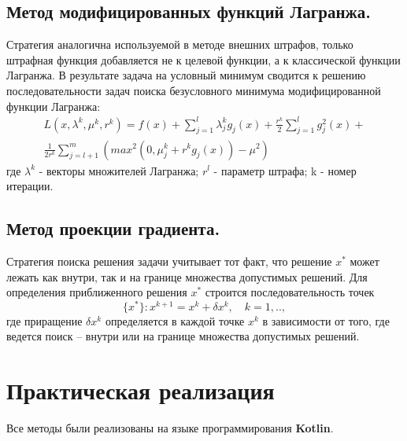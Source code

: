 \documentclass[a4paper, 12pt]{article}   	%
\begin{document}
    
\subsection{Метод модифицированных функций Лагранжа.}
    Стратегия аналогична используемой в методе внешних штрафов, только штрафная функция добавляется не к целевой функции, а к классической функции Лагранжа. В результате задача на условный минимум сводится к решению последовательности задач поиска безусловного минимума модифицированной функции Лагранжа:
    \begin{multline}
        L(x, \lambda ^k, \mu ^k, r^k) = f(x) + \sum_{j=1}^l \lambda_j^k g_j(x) + \frac{r^k}{2} \sum_{j=1}^{l} g_j^2(x) + \\ \frac{1}{2r^k} \sum_{j=l+1}^{m} (max^2(0, \mu_j^k + r^k g_j(x)) - \mu^2)
    \end{multline}
    где $\lambda ^k$  - векторы множителей Лагранжа; $r^l$ - параметр штрафа; k - номер итерации.



\subsection{Метод проекции градиента.}
    Стратегия поиска решения задачи учитывает тот факт, что решение $x^*$ может лежать как внутри, так и на границе множества допустимых решений.
    Для определения приближенного решения $x^*$ строится последовательность точек 
    \begin{equation}
        \{x^*\}: x^{k+1} = x^k + \delta x^k, \quad k=1,.., 
    \end{equation}
    где приращение $\delta x^k$ определяется в каждой точке $x^k$ в зависимости от того, где ведется поиск – внутри или на границе множества допустимых решений.

\newpage

\section{Практическая реализация}

    Все методы были реализованы на языке программирования \textbf{Kotlin}. 
\end{document}
